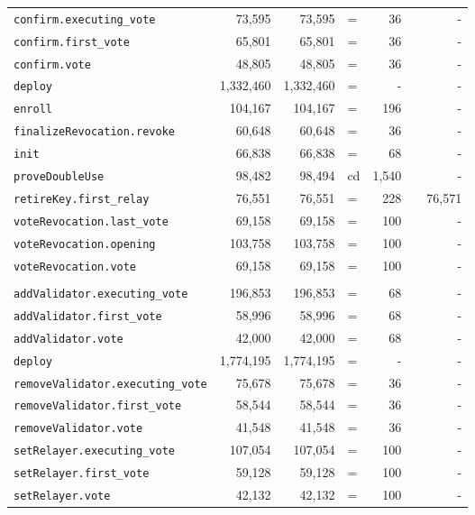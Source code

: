 \documentclass[10pt]{article}
\begin{document}
{\begin{longtable}{@{}lrrlrcr@{}}
\quad\texttt{confirm.executing\_vote} & 73{,}595 & 73{,}595 & = & 36 &  & - \\
\quad\texttt{confirm.first\_vote} & 65{,}801 & 65{,}801 & = & 36 &  & - \\
\quad\texttt{confirm.vote} & 48{,}805 & 48{,}805 & = & 36 &  & - \\
\quad\texttt{deploy} & 1{,}332{,}460 & 1{,}332{,}460 & = & - &  & - \\
\quad\texttt{enroll} & 104{,}167 & 104{,}167 & = & 196 &  & - \\
\quad\texttt{finalizeRevocation.revoke} & 60{,}648 & 60{,}648 & = & 36 &  & - \\
\quad\texttt{init} & 66{,}838 & 66{,}838 & = & 68 &  & - \\
\quad\texttt{proveDoubleUse} & 98{,}482 & 98{,}494 & cd & 1{,}540 &  & - \\
\quad\texttt{retireKey.first\_relay} & 76{,}551 & 76{,}551 & = & 228 &  & 76{,}571 \\
\quad\texttt{voteRevocation.last\_vote} & 69{,}158 & 69{,}158 & = & 100 &  & - \\
\quad\texttt{voteRevocation.opening} & 103{,}758 & 103{,}758 & = & 100 &  & - \\
\quad\texttt{voteRevocation.vote} & 69{,}158 & 69{,}158 & = & 100 &  & - \\
\addlinespace[3pt]
\multicolumn{7}{@{}l}{\textbf{\texttt{Governance}}}\\
\quad\texttt{addValidator.executing\_vote} & 196{,}853 & 196{,}853 & = & 68 &  & - \\
\quad\texttt{addValidator.first\_vote} & 58{,}996 & 58{,}996 & = & 68 &  & - \\
\quad\texttt{addValidator.vote} & 42{,}000 & 42{,}000 & = & 68 &  & - \\
\quad\texttt{deploy} & 1{,}774{,}195 & 1{,}774{,}195 & = & - &  & - \\
\quad\texttt{removeValidator.executing\_vote} & 75{,}678 & 75{,}678 & = & 36 &  & - \\
\quad\texttt{removeValidator.first\_vote} & 58{,}544 & 58{,}544 & = & 36 &  & - \\
\quad\texttt{removeValidator.vote} & 41{,}548 & 41{,}548 & = & 36 &  & - \\
\quad\texttt{setRelayer.executing\_vote} & 107{,}054 & 107{,}054 & = & 100 &  & - \\
\quad\texttt{setRelayer.first\_vote} & 59{,}128 & 59{,}128 & = & 100 &  & - \\
\quad\texttt{setRelayer.vote} & 42{,}132 & 42{,}132 & = & 100 &  & - \\

\end{longtable}}
\end{document}
